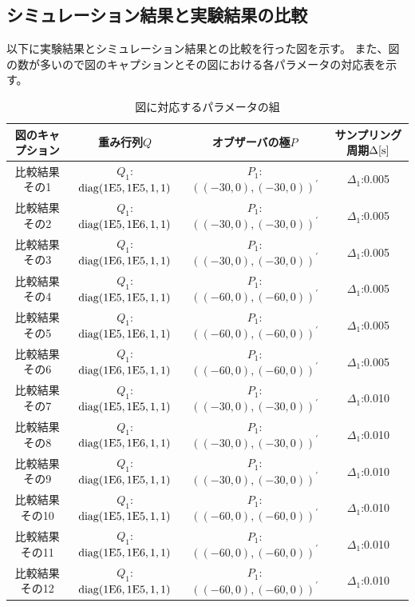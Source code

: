 	\subsection{シミュレーション結果と実験結果の比較}
	以下に実験結果とシミュレーション結果との比較を行った図を示す。
	また、図の数が多いので図のキャプションとその図における各パラメータの対応表を示す。
	\begin{table}[H]
		\begin{center}
			\caption{図に対応するパラメータの組}
			\begin{tabular}{|c|c|c|c|}\hline
				図のキャプション & 重み行列$Q$ & オブザーバの極$P$ & サンプリング周期$\Delta[\rm{s}]$ \\ \hline\hline
				比較結果その1 & $Q_1$:$\rm{diag}(1E5,1E5,1,1)$ & $P_1$:$((-30,0),(-30,0))^{'}$ & $\Delta_1$:0.005 \\ \hline
				比較結果その2 & $Q_1$:$\rm{diag}(1E5,1E6,1,1)$ & $P_1$:$((-30,0),(-30,0))^{'}$ & $\Delta_1$:0.005 \\ \hline
				比較結果その3 & $Q_1$:$\rm{diag}(1E6,1E5,1,1)$ & $P_1$:$((-30,0),(-30,0))^{'}$ & $\Delta_1$:0.005 \\ \hline
				比較結果その4 & $Q_1$:$\rm{diag}(1E5,1E5,1,1)$ & $P_1$:$((-60,0),(-60,0))^{'}$ & $\Delta_1$:0.005 \\ \hline
				比較結果その5 & $Q_1$:$\rm{diag}(1E5,1E6,1,1)$ & $P_1$:$((-60,0),(-60,0))^{'}$ & $\Delta_1$:0.005 \\ \hline
				比較結果その6 & $Q_1$:$\rm{diag}(1E6,1E5,1,1)$ & $P_1$:$((-60,0),(-60,0))^{'}$ & $\Delta_1$:0.005 \\ \hline
				比較結果その7 & $Q_1$:$\rm{diag}(1E5,1E5,1,1)$ & $P_1$:$((-30,0),(-30,0))^{'}$ & $\Delta_1$:0.010 \\ \hline
				比較結果その8 & $Q_1$:$\rm{diag}(1E5,1E6,1,1)$ & $P_1$:$((-30,0),(-30,0))^{'}$ & $\Delta_1$:0.010 \\ \hline
				比較結果その9 & $Q_1$:$\rm{diag}(1E6,1E5,1,1)$ & $P_1$:$((-30,0),(-30,0))^{'}$ & $\Delta_1$:0.010 \\ \hline
				比較結果その10 & $Q_1$:$\rm{diag}(1E5,1E5,1,1)$ & $P_1$:$((-60,0),(-60,0))^{'}$ & $\Delta_1$:0.010 \\ \hline
				比較結果その11 & $Q_1$:$\rm{diag}(1E5,1E6,1,1)$ & $P_1$:$((-60,0),(-60,0))^{'}$ & $\Delta_1$:0.010 \\ \hline
				比較結果その12 & $Q_1$:$\rm{diag}(1E6,1E5,1,1)$ & $P_1$:$((-60,0),(-60,0))^{'}$ & $\Delta_1$:0.010 \\ \hline
			\end{tabular}
		\end{center}
		\label{table:huriage_control}
	\end{table}
	
